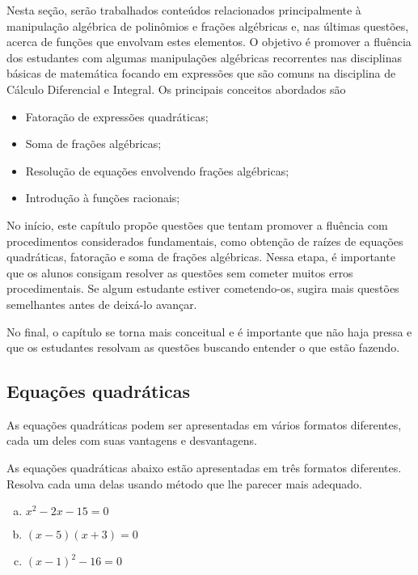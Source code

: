 \documentclass[main_estudante.tex]{subfiles}
\begin{document}
Nesta seção, serão trabalhados conteúdos relacionados principalmente à manipulação algébrica de polinômios e frações algébricas e, nas últimas questões, acerca de funções que envolvam estes elementos. O objetivo é promover a fluência dos estudantes com algumas manipulações algébricas recorrentes nas disciplinas básicas de matemática focando em expressões que são comuns na disciplina de Cálculo Diferencial e Integral. Os principais conceitos abordados são

\begin{itemize}
 \item Fatoração de expressões quadráticas;
 \item Soma de frações algébricas;
 \item Resolução de equações envolvendo frações algébricas;
 \item Introdução à funções racionais;
\end{itemize}

No início, este capítulo propõe questões que tentam promover a fluência com procedimentos considerados fundamentais, como obtenção de raízes de equações quadráticas, fatoração e soma de frações algébricas. Nessa etapa, é importante que os alunos consigam resolver as questões sem cometer muitos erros procedimentais. Se algum estudante estiver cometendo-os, sugira mais questões semelhantes antes de deixá-lo avançar.

No final, o capítulo se torna mais conceitual e é importante que não haja pressa e que os estudantes resolvam as questões buscando entender o que estão fazendo.

\paraAmbos

\subsection*{Equações quadráticas}

As equações quadráticas podem ser apresentadas em vários formatos diferentes, cada um deles com suas vantagens e desvantagens. 

\begin{questao}
 As equações quadráticas abaixo estão apresentadas em três formatos diferentes. Resolva cada uma delas usando método que lhe parecer mais adequado.
\begin{enumerate}[a)]
\item $x^2-2x-15=0$
\item $(x-5)(x+3)=0$
\item $(x-1)^2-16=0$
\end{enumerate}
\end{questao}
\end{document}
